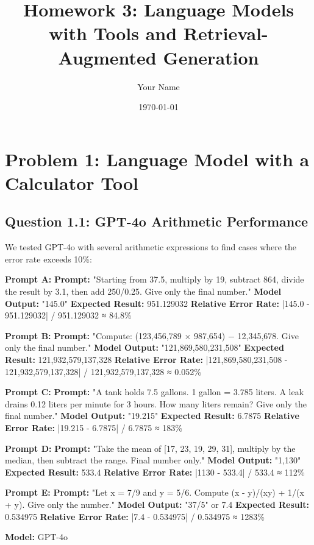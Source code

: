 \documentclass[11pt]{article}
\title{Homework 3: Language Models with Tools and Retrieval-Augmented Generation}
\author{Your Name}
\date{\today}
\begin{document}
\maketitle

\section{Problem 1: Language Model with a Calculator Tool}

\subsection{Question 1.1: GPT-4o Arithmetic Performance}

We tested GPT-4o with several arithmetic expressions to find cases where the error rate exceeds 10\%:

\textbf{Prompt A:}
\textbf{Prompt:} "Starting from 37.5, multiply by 19, subtract 864, divide the result by 3.1, then add 250/0.25. Give only the final number."
\textbf{Model Output:} "145.0"
\textbf{Expected Result:} 951.129032
\textbf{Relative Error Rate:} |145.0 - 951.129032| / 951.129032 ≈ 84.8\%

\textbf{Prompt B:}
\textbf{Prompt:} "Compute: (123,456,789 × 987,654) − 12,345,678. Give only the final number."
\textbf{Model Output:} "121,869,580,231,508"
\textbf{Expected Result:} 121,932,579,137,328
\textbf{Relative Error Rate:} |121,869,580,231,508 - 121,932,579,137,328| / 121,932,579,137,328 ≈ 0.052\%

\textbf{Prompt C:}
\textbf{Prompt:} "A tank holds 7.5 gallons. 1 gallon = 3.785 liters. A leak drains 0.12 liters per minute for 3 hours. How many liters remain? Give only the final number."
\textbf{Model Output:} "19.215"
\textbf{Expected Result:} 6.7875
\textbf{Relative Error Rate:} |19.215 - 6.7875| / 6.7875 ≈ 183\%

\textbf{Prompt D:}
\textbf{Prompt:} "Take the mean of [17, 23, 19, 29, 31], multiply by the median, then subtract the range. Final number only."
\textbf{Model Output:} "1,130"
\textbf{Expected Result:} 533.4
\textbf{Relative Error Rate:} |1130 - 533.4| / 533.4 ≈ 112\%

\textbf{Prompt E:}
\textbf{Prompt:} "Let x = 7/9 and y = 5/6. Compute (x - y)/(xy) + 1/(x + y). Give only the number."
\textbf{Model Output:} "37/5" or 7.4
\textbf{Expected Result:} 0.534975
\textbf{Relative Error Rate:} |7.4 - 0.534975| / 0.534975 ≈ 1283\%

\textbf{Model:} GPT-4o
\end{document}
